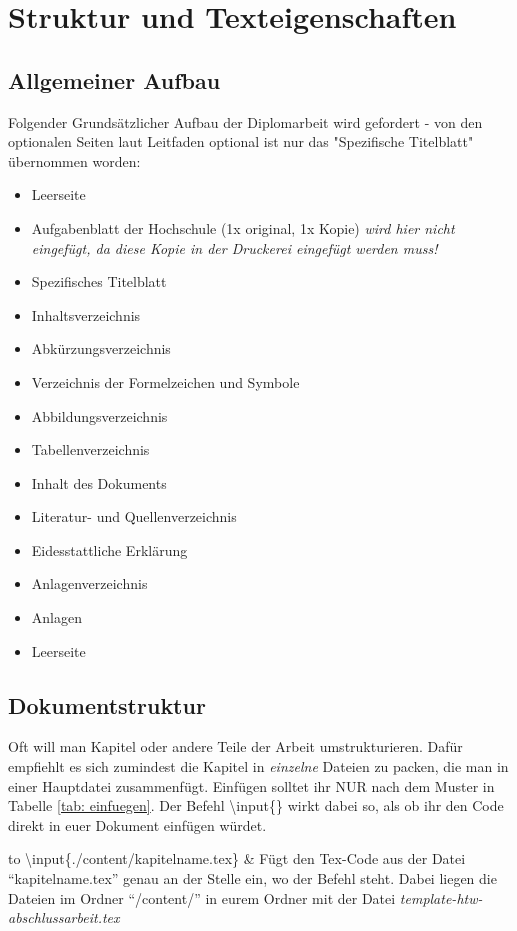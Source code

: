 \chapter{Struktur und Texteigenschaften}%
\section{Allgemeiner Aufbau}%
Folgender Grundsätzlicher Aufbau der Diplomarbeit wird gefordert - von den optionalen Seiten laut Leitfaden optional ist nur das "Spezifische Titelblatt" übernommen worden:%
\begin{itemize}%
 \item Leerseite%
 \item Aufgabenblatt der Hochschule (1x original, 1x Kopie) \emph{wird hier nicht eingefügt, da diese Kopie in der Druckerei eingefügt werden muss!}%
 \item Spezifisches Titelblatt%
 \item Inhaltsverzeichnis%
 \item Abkürzungsverzeichnis%
 \item Verzeichnis der Formelzeichen und Symbole%
 \item Abbildungsverzeichnis%
 \item Tabellenverzeichnis%
 \item Inhalt des Dokuments%
 \item Literatur- und Quellenverzeichnis%
 \item Eidesstattliche Erklärung%
 \item Anlagenverzeichnis%
 \item Anlagen%
 \item Leerseite%
\end{itemize}%
%
%
%
\section{Dokumentstruktur}%
Oft will man Kapitel oder andere Teile der Arbeit umstrukturieren. Dafür empfiehlt es sich zumindest die Kapitel in \emph{einzelne} Dateien zu packen, die man in einer Hauptdatei zusammenfügt. Einfügen solltet ihr \textsc{NUR} nach dem Muster in Tabelle \ref{tab: einfuegen}. Der Befehl \textbackslash input\{\} wirkt dabei so, als ob ihr den Code direkt in euer Dokument einfügen würdet.%
\begin{table}[h]%
\begin{tabu} to \textwidth {X[c]X[c]}%
\toprule%
\textbackslash input\{./content/kapitelname.tex\} & Fügt den Tex-Code aus der Datei "`kapitelname.tex"' genau an der Stelle ein, wo der Befehl steht. Dabei liegen die Dateien im Ordner "`/content/"' in eurem Ordner mit der Datei \emph{template-htw-abschlussarbeit.tex}\\%
\bottomrule%
\end{tabu}%
\caption{Einfuegen}%
\label{tab: einfuegen}%
\end{table}%
%
%
